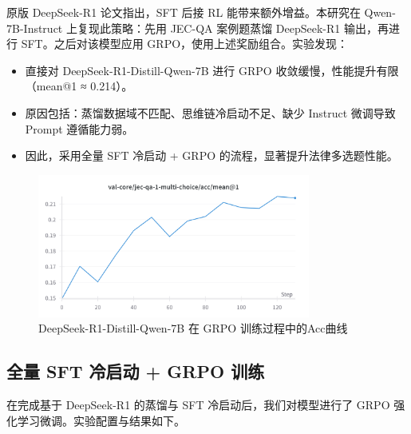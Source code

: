 \documentclass{pkuthesis}
\begin{document}
原版 DeepSeek-R1 论文指出，SFT 后接 RL 能带来额外增益。本研究在 Qwen-7B-Instruct 上复现此策略：先用 JEC-QA 案例题蒸馏 DeepSeek-R1 输出，再进行 SFT。之后对该模型应用 GRPO，使用上述奖励组合。实验发现：

\begin{itemize}
  \item 直接对 DeepSeek-R1-Distill-Qwen-7B 进行 GRPO 收敛缓慢，性能提升有限（mean@1 ≈ 0.214）。
  \item 原因包括：蒸馏数据域不匹配、思维链冷启动不足、缺少 Instruct 微调导致 Prompt 遵循能力弱。
  \item 因此，采用全量 SFT 冷启动 + GRPO 的流程，显著提升法律多选题性能。
\end{itemize}

\begin{figure}[h]
  \centering
  \includegraphics[width=0.8\textwidth]{figures/GRPO_DeepSeek-R1-Distill-Qwen-7B.png}
  \caption{DeepSeek-R1-Distill-Qwen-7B 在 GRPO 训练过程中的Acc曲线}
  \label{fig:grpo_distill}
\end{figure}

\subsection{全量 SFT 冷启动 + GRPO 训练}

在完成基于 DeepSeek-R1 的蒸馏与 SFT 冷启动后，我们对模型进行了 GRPO 强化学习微调。实验配置与结果如下。
\end{document}
